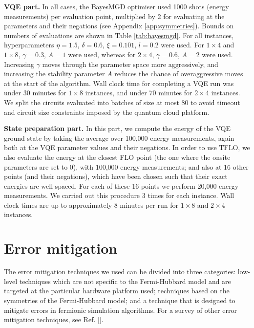 \documentclass[aps,prb,twoside,superscriptaddress,longbibliography,nofootinbib,floatfix, notitlepage,twocolumn]{revtex4-1}
\begin{document}
\textbf{VQE part.} In all cases, the BayesMGD optimiser used 1000 shots (energy measurements) per evaluation point, multiplied by 2 for evaluating at the parameters and their negations (see Appendix \ref{app:symmetries}). Bounds on numbers of evaluations are shown in Table \ref{tab:bayesmgd}. For all instances, hyperparameters $\eta=1.5$, $\delta = 0.6$, $\xi = 0.101$, $l = 0.2$ were used.
For $1\times 4$ and $1\times 8$, $\gamma = 0.3$, $A=1$ were used, whereas for $2\times 4$, $\gamma = 0.6$, $A=2$ were used. Increasing $\gamma$ moves through the parameter space more aggressively, and increasing the stability parameter $A$ reduces the chance of overaggressive moves at the start of the algorithm. Wall clock time for completing a VQE run was under 30 minutes for $1\times 8$ instances, and under 70 minutes for $2\times 4$ instances. We split the circuits evaluated into batches of size at most 80 to avoid timeout and circuit size constraints imposed by the quantum cloud platform.

\textbf{State preparation part.} In this part, we compute the energy of the VQE ground state by taking the average over 100,000 energy measurements, again both at the VQE parameter values and their negations. In order to use TFLO, we also evaluate the energy at the closest FLO point (the one where the onsite parameters are set to 0), with 100,000 energy measurements; and also at 16 other points (and their negations), which have been chosen such that their exact energies are well-spaced. For each of these 16 points we perform 20,000 energy measurements. We carried out this procedure 3 times for each instance. Wall clock times are up to approximately 8 minutes per run for $1\times 8$ and $2\times 4$ instances.


\section{Error mitigation}
\label{app:error_mitigation}

The error mitigation techniques we used can be divided into three categories: low-level techniques which are not specific to the Fermi-Hubbard model and are targeted at the particular hardware platform used; techniques based on the symmetries of the Fermi-Hubbard model; and a technique that is designed to mitigate errors in fermionic simulation algorithms. For a survey of other error mitigation techniques, see Ref. [].
\end{document}
